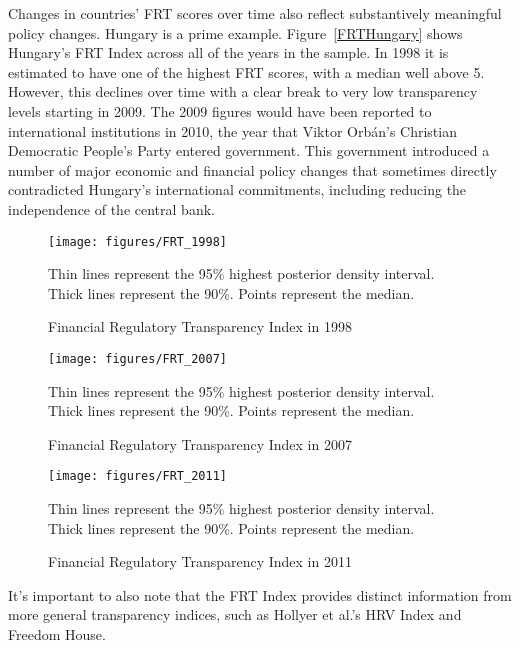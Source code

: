 \documentclass[a4paper]{article}
\begin{document}
Changes in countries' FRT scores over time also reflect substantively meaningful policy changes. Hungary is a prime example. Figure~\ref{FRTHungary} shows Hungary's FRT Index across all of the years in the sample. In 1998 it is estimated to have one of the highest FRT scores, with a median well above 5. However, this declines over time with a clear break to very low transparency levels starting in 2009. The 2009 figures would have been reported to international institutions in 2010, the year that Viktor Orb\'{a}n's Christian Democratic People's Party entered government. This government introduced a number of major economic and financial policy changes that sometimes directly contradicted Hungary's international commitments, including reducing the independence of the central bank. 

\begin{figure}
    \caption{Financial Regulatory Transparency Index in 1998}
    \label{FRT_1998}
    \begin{center}
        \texttt{[image: figures/FRT\_1998]}
    \end{center}
    {\scriptsize{Thin lines represent the 95\% highest posterior density interval. Thick lines represent the 90\%. Points represent the median.}}
\end{figure}

\begin{figure}
    \caption{Financial Regulatory Transparency Index in 2007}
    \label{FRT_2007}
    \begin{center}
        \texttt{[image: figures/FRT\_2007]}
    \end{center}
    {\scriptsize{Thin lines represent the 95\% highest posterior density interval. Thick lines represent the 90\%. Points represent the median.}}
\end{figure}

\begin{figure}
    \caption{Financial Regulatory Transparency Index in 2011}
    \label{FRT_2011}
    \begin{center}
        \texttt{[image: figures/FRT\_2011]}
    \end{center}
    {\scriptsize{Thin lines represent the 95\% highest posterior density interval. Thick lines represent the 90\%. Points represent the median.}}
\end{figure}

It's important to also note that the FRT Index provides distinct information from more general transparency indices, such as Hollyer et al.'s HRV Index and Freedom House.   
\end{document}
